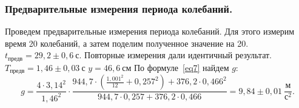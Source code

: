 \documentclass[a4paper,11pt]{article}
\begin{document}
\subsubsection{Предварительные измерения периода колебаний.} %
Проведем предварительные измерения периода колебаний. Для этого измерим время 20 колебаний, а затем поделим полученное значение на 20.\newline
$t_{предв} = 29,2 \pm 0,6\ с$. Повторные измерения дали идентичный результат.\newline
$T_{предв} = 1,46 \pm 0,03\ с$\newline
$y = 46,6\ см$\newline
По формуле~\ref{eq7} найдем $g$:
$$g = \frac{4 \cdot 3,14^{2}}{1,46^{2}} \cdot \frac{944,7 \cdot (\frac{1,001^{2}}{12} + 0,257^{2}) + 376,2 \cdot 0,466^{2}}{944,7 \cdot 0,257 + 376,2 \cdot 0,466} = 9,84 \pm 0,01\ \frac{м}{с^{2}}.$$
\end{document}

